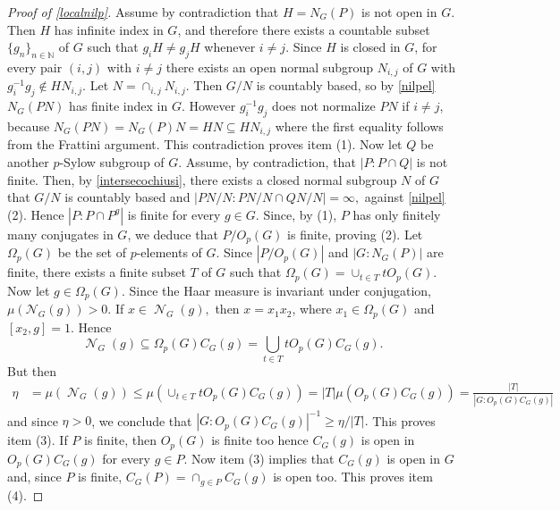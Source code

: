 \documentclass{amsart}
\DeclareMathOperator{\nil}{\mathcal N}
\newtheorem{prop}[thm]{Proposition} \newtheorem{rem}[thm]{Remark}
\numberwithin{equation}{section}
\begin{document}
\begin{proof}[Proof of \cref{localnilp}]
	Assume by contradiction that $H=N_G(P)$ is not open in $G.$ Then $H$ has infinite index in $G$, and therefore there exists a countable subset $\{g_n\}_{n\in \mathbb N}$ of $G$ such that $g_iH \neq g_jH$ whenever $i\neq j.$ Since $H$ is closed in $G$, for every pair $(i,j)$ with $i\neq j$ there exists an open normal subgroup $N_{i,j}$ of $G$ with $g_i^{-1}g_j\notin HN_{i,j}.$ Let $N=\cap_{i,j}N_{i,j}.$ Then $G/N$ is countably based, so by \cref{nilpel} $N_G(PN)$ has finite index in $G$. However $g_i^{-1}g_j$ does not normalize $PN$ if $i \neq j$, because $N_G(PN)=N_G(P)N=HN \subseteq HN_{i,j}$ where the first equality follows from the Frattini argument. This contradiction proves item (1). Now let $Q$ be another $p$-Sylow subgroup of $G$. Assume, by contradiction, that $|P:P\cap Q|$ is not finite. Then, by \cref{intersecochiusi}, there exists a closed normal subgroup $N$ of $G$ that $G/N$ is countably based and $|PN/N:PN/N\cap QN/N|=\infty,$ against \cref{nilpel} (2). Hence $|P: P\cap P^g|$ is finite for every $g\in G$. Since, by (1), $P$ has only finitely many conjugates in $G$, we deduce that $P/O_p(G)$ is finite, proving (2). Let $\Omega_p(G)$ be the set of $p$-elements of $G$. Since $|P/O_p(G)|$ and $|G:N_G(P)|$ are finite, there exists a finite subset $T$ of $G$ such that $\Omega_p(G) = \cup_{t\in T} tO_p(G).$ Now let $g\in \Omega_p(G).$ Since the Haar measure is invariant under conjugation, $\mu(\mathcal{N}_G(g))>0$. If $x\in \nil_G(g),$ then $x=x_1x_2$, where $x_1\in \Omega_p(G)$ and $[x_2,g]=1.$ Hence
    $$\nil_G(g)\subseteq \Omega_p(G)C_G(g)=\bigcup_{t\in T}tO_p(G)C_G(g).$$
	But then 
    \begin{align*}
    \eta & =\mu(\nil_G(g))\leq \mu(\cup_{t\in T}tO_p(G)C_G(g))=|T|\mu(O_p(G)C_G(g)) =\frac{|T|}{|G:O_p(G)C_G(g)|}
    \end{align*}
    and since $\eta > 0$, we conclude that 
	$|G:O_p(G)C_G(g)|^{-1}\geq \eta/|T|.$ This proves item (3). If $P$ is finite, then $O_p(G)$ is finite too hence $C_G(g)$ is open in $O_p(G) C_G(g)$ for every $g \in P$. Now item (3) implies that $C_G(g)$ is open in $G$ and, since $P$ is finite, $C_G(P) = \cap_{g \in P} C_G(g)$ is open too. This proves item (4).
\end{proof}

\end{document}
